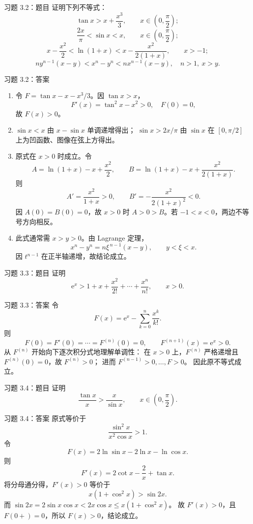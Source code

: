 \documentclass[aspectratio=169,10pt]{ctexbeamer}
\newcommand{\ee}{\mathrm{e}}
\begin{document}
\begin{frame}{习题 3.2：题目}
\footnotesize
证明下列不等式：
\[
  \tan x>x+\frac{x^3}{3},\qquad x\in\left(0,\frac\pi2\right);
\]
\[
  \frac{2x}{\pi}<\sin x<x,\qquad x\in\left(0,\frac\pi2\right);
\]
\[
  x-\frac{x^2}{2}<\ln(1+x)<x-\frac{x^2}{2(1+x)},\qquad x>-1;
\]
\[
  ny^{n-1}(x-y)<x^n-y^n<nx^{n-1}(x-y),
  \quad n>1,\ x>y.
\]
\end{frame}

\begin{frame}{习题 3.2：答案}
\scriptsize
\begin{enumerate}
  \item 令 $F=\tan x-x-x^3/3$。因 $\tan x>x$，
  \[
    F'(x)=\tan^2x-x^2>0,\quad F(0)=0,
  \]
  故 $F(x)>0$。
  \item $\sin x<x$ 由 $x-\sin x$ 单调递增得出；
  $\sin x>2x/\pi$ 由 $\sin x$ 在 $[0,\pi/2]$ 上为凹函数、图像在弦上方得出。
  \item 原式在 $x>0$ 时成立。令
  \[
    A=\ln(1+x)-x+\frac{x^2}{2},\qquad
    B=\ln(1+x)-x+\frac{x^2}{2(1+x)}.
  \]
  则
  \[
    A'=\frac{x^2}{1+x}>0,\qquad
    B'=-\frac{x^2}{2(1+x)^2}<0.
  \]
  因 $A(0)=B(0)=0$，故 $x>0$ 时 $A>0>B$。若 $-1<x<0$，两边不等号方向相反。
  \item 此式通常需 $x>y>0$。由 Lagrange 定理，
  \[
    x^n-y^n=n\xi^{\,n-1}(x-y),\qquad y<\xi<x.
  \]
  因 $t^{n-1}$ 在正半轴递增，故结论成立。
\end{enumerate}
\end{frame}

\begin{frame}{习题 3.3：题目}
\small
证明
\[
  \ee^x>1+x+\frac{x^2}{2!}+\cdots+\frac{x^n}{n!},
  \qquad x>0.
\]
\end{frame}

\begin{frame}{习题 3.3：答案}
\small
令
\[
  F(x)=\ee^x-\sum_{k=0}^{n}\frac{x^k}{k!}.
\]
则
\[
  F(0)=F'(0)=\cdots=F^{(n)}(0)=0,\qquad
  F^{(n+1)}(x)=\ee^x>0.
\]
从 $F^{(n)}$ 开始向下逐次积分式地理解单调性：
在 $x>0$ 上，$F^{(n)}$ 严格递增且 $F^{(n)}(0)=0$，故 $F^{(n)}>0$；
进而 $F^{(n-1)}>0,\ldots,F>0$。
因此原不等式成立。
\end{frame}

\begin{frame}{习题 3.4：题目}
\small
证明
\[
  \frac{\tan x}{x}>\frac{x}{\sin x},
  \qquad x\in\left(0,\frac\pi2\right).
\]
\end{frame}

\begin{frame}{习题 3.4：答案}
\small
原式等价于
\[
  \frac{\sin^2 x}{x^2\cos x}>1.
\]
令
\[
  F(x)=2\ln\sin x-2\ln x-\ln\cos x.
\]
则
\[
  F'(x)=2\cot x-\frac2x+\tan x.
\]
将分母通分得，$F'(x)>0$ 等价于
\[
  x(1+\cos^2x)>\sin2x.
\]
而 $\sin2x=2\sin x\cos x<2x\cos x\le x(1+\cos^2x)$。
故 $F'(x)>0$，且 $F(0+)=0$，所以 $F(x)>0$，结论成立。
\end{frame}
\end{document}
